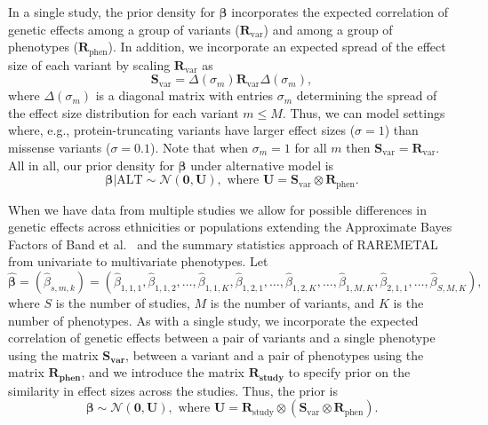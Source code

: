 \documentclass{nature}
\def\bs{\boldsymbol}
\begin{document}
\noindent In a single study, the prior density for ${\bs {\beta}}$ incorporates the expected correlation of genetic effects among 
a group of variants ($\mathbf{R}_{\textrm{var}}$) and among a group of phenotypes ($\mathbf{R}_{\textrm{phen}}$). 
In addition, we  incorporate an expected spread of the effect size of each variant by scaling $\mathbf{R}_{\textrm{var}}$ as 
$$\mathbf{S}_{\textrm{var}} = \Delta\left(\sigma_m\right) \mathbf{R}_{\textrm{var}} \Delta\left(\sigma_m\right),$$
\noindent where $\Delta\left(\sigma_m\right)$ is a diagonal matrix with entries $\sigma_m$ determining the spread of the effect size distribution for each variant $m \leq M$. Thus, we can model settings where, e.g., protein-truncating variants have larger effect sizes ($\sigma = 1$) than missense variants ($\sigma = 0.1$). 
Note that when $\sigma_m = 1$ for all $m$ then $\mathbf{S}_{\textrm{var}} = \mathbf{R}_{\textrm{var}}$. 
\noindent All in all, our prior density for ${\bs \beta}$ under alternative model is 
$${\bs {\beta}}|\textrm{ALT} \sim \mathcal{N}\left(\mathbf{0}, \mathbf{U}\right), \textrm{ where } \mathbf{U} = \mathbf{S}_{\textrm{var}} \otimes \mathbf{R}_{\textrm{phen}}.$$

\noindent When we have data from multiple studies 
we allow for possible differences in genetic effects across ethnicities or populations 
extending the Approximate Bayes Factors of Band et al.~\cite{band2013imputation}
and the summary statistics approach of RAREMETAL ~\cite{liu2014meta} from univariate to multivariate phenotypes.
Let $\bs {\widehat{ \beta}} = \left(\widehat{ \beta}_{s,m,k}\right)=\left(\widehat{\beta}_{1,1,1}, \widehat{\beta}_{1,1,2}, \dots, \widehat{\beta}_{1,1,K}, \widehat{\beta}_{1,2,1}, \dots, \widehat{\beta}_{1,2,K}, \dots, \widehat{\beta}_{1,M,K}, \widehat{\beta}_{2,1,1}, \dots, \widehat{\beta}_{S,M,K}\right),$ where $S$ is the number of studies, $M$ is the number of variants, and $K$ is the number of phenotypes. 
As with a single study, we incorporate the expected correlation of genetic effects between a pair of variants and a single phenotype using the matrix $\mathbf{S_{\textrm{var}}}$, between a variant and a pair of phenotypes using the matrix $\mathbf{R_{\textrm{phen}}}$, and we introduce the matrix $\mathbf{R_{\textrm{study}}}$ to specify prior on the similarity in effect sizes across the studies.
Thus, the prior is
$${\bs {\beta}} \sim \mathcal{N}\left(\mathbf{0}, \mathbf{U}\right), \textrm{ where } 
\mathbf{U} = \mathbf{R}_{\textrm{study}}\otimes\left(\mathbf{S}_{\textrm{var}} \otimes \mathbf{R}_{\textrm{phen}}\right).$$
\end{document}
